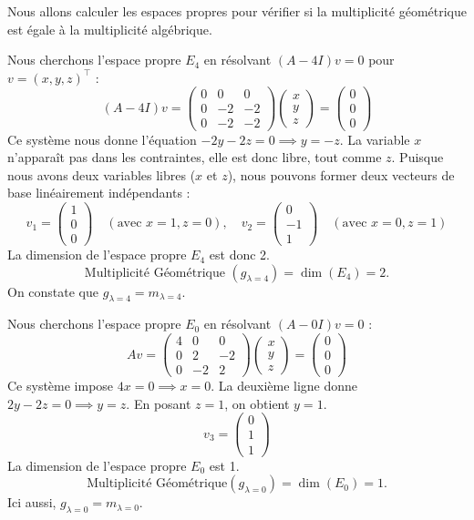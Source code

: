 \documentclass[12pt]{report}
\begin{document}
\noindent Nous allons calculer les espaces propres pour vérifier si la multiplicité géométrique est égale à la multiplicité algébrique.

Nous cherchons l'espace propre $E_4$ en résolvant $(A - 4I)v = 0$ pour $v = (x, y, z)^\top$ :
\[
    (A - 4I)v = \begin{pmatrix} 0 & 0 & 0 \\ 0 & -2 & -2 \\ 0 & -2 & -2 \end{pmatrix} \begin{pmatrix} x \\ y \\ z \end{pmatrix} = \begin{pmatrix} 0 \\ 0 \\ 0 \end{pmatrix}
\]
\noindent Ce système nous donne l'équation $-2y - 2z = 0 \implies y = -z$. La variable $x$ n'apparaît pas dans les contraintes, elle est donc libre, tout comme $z$.
\noindent Puisque nous avons deux variables libres ($x$ et $z$), nous pouvons former deux vecteurs de base linéairement indépendants :
\[
    v_1 = \begin{pmatrix} 1 \\ 0 \\ 0 \end{pmatrix} \quad (\text{avec } x=1, z=0), \quad
    v_2 = \begin{pmatrix} 0 \\ -1 \\ 1 \end{pmatrix} \quad (\text{avec } x=0, z=1)
\]
La dimension de l'espace propre $E_4$ est donc 2.
\[
    \text{Multiplicité Géométrique } (g_{\lambda=4}) = \dim(E_4) = 2.
\]
\noindent On constate que $g_{\lambda=4} = m_{\lambda=4}$.

\noindent Nous cherchons l'espace propre $E_0$ en résolvant $(A - 0I)v = 0$ :
\[
    Av = \begin{pmatrix} 4 & 0 & 0 \\ 0 & 2 & -2 \\ 0 & -2 & 2 \end{pmatrix} \begin{pmatrix} x \\ y \\ z \end{pmatrix} = \begin{pmatrix} 0 \\ 0 \\ 0 \end{pmatrix}
\]
\noindent Ce système impose $4x = 0 \implies x = 0$. La deuxième ligne donne $2y - 2z = 0 \implies y = z$. En posant $z=1$, on obtient $y=1$.
\[
    v_3 = \begin{pmatrix} 0 \\ 1 \\ 1 \end{pmatrix}
\]
\noindent La dimension de l'espace propre $E_0$ est 1.
\[
    \text {Multiplicité Géométrique}  (g_{\lambda=0}) = \dim(E_0) = 1.
\]
\noindent Ici aussi, $g_{\lambda=0} = m_{\lambda=0}$.
\end{document}
